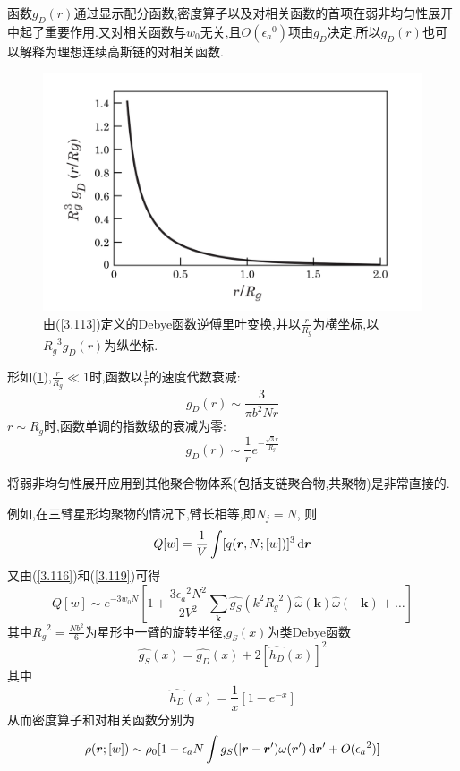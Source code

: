 函数$g_D(r)$通过显示配分函数,密度算子以及对相关函数的首项在弱非均匀性展开中起了重要作用.又对相关函数与$w_0$无关,且$O({\epsilon_a}^0)$项由$g_D$决定,所以$g_D(r)$也可以解释为理想连续高斯链的对相关函数.
\begin{figure}[H]
	\centering
	\includegraphics[scale=0.4]{./figures/FIG3-9.png}
	\caption{由(\ref{3.113})定义的Debye函数逆傅里叶变换,并以$\frac{r}{R_g}$为横坐标,以${R_g}^3 g_D(r)$为纵坐标.}
	\label{FIG3.9}
\end{figure}

形如(\ref{FIG3.9}),$\frac{r}{R_g} \ll 1$时,函数以$\frac{1}{r}$的速度代数衰减:
\begin{equation}
g_D(r) \sim \frac{3}{\pi b^2 N r}
\end{equation}
$r \sim R_g$时,函数单调的指数级的衰减为零:
$$g_D(r) \sim \frac{1}{r} e^{-\frac{\sqrt{3}r}{R_g}}$$

将弱非均匀性展开应用到其他聚合物体系(包括支链聚合物,共聚物)是非常直接的.

例如,在三臂星形均聚物的情况下,臂长相等,即$N_j = N$,
则
\begin{equation}
Q[w] = \frac{1}{V} \int [q(\bm{r} ,N;[w])]^3\,\mathrm{d} \bm{r} 
\end{equation}
又由(\ref{3.116})和(\ref{3.119})可得
\begin{equation}
Q[w] \sim e^{-3w_0 N} [1+\frac{3 {\epsilon_a}^2 N^2}{2V^2} \sum_{\mathbf{k}} \hat{g_S}(k^2 {R_g}^2)\hat{\omega}(\mathbf{k})\hat{\omega}(-\mathbf{k})+\dots]
\end{equation}
其中${R_g}^2 = \frac{Nb^2}{6}$为星形中一臂的旋转半径,$g_S(x)$为类Debye函数
\begin{equation}
\hat{g_S}(x) = \hat{g_D}(x) + 2[\hat{h_D}(x)]^2
\end{equation}
其中
\begin{equation}
\hat{h_D}(x) = \frac{1}{x} [1-e^{-x}]
\end{equation}
从而密度算子和对相关函数分别为
\begin{equation}
\rho(\bm{r} ;[w]) \sim \rho_0[1-\epsilon_a N \int g_S(|\bm{r} -\bm{r} ') \omega(\bm{r} ')\,\mathrm{d} \bm{r} '+O({\epsilon_a}^2)]
\end{equation}

